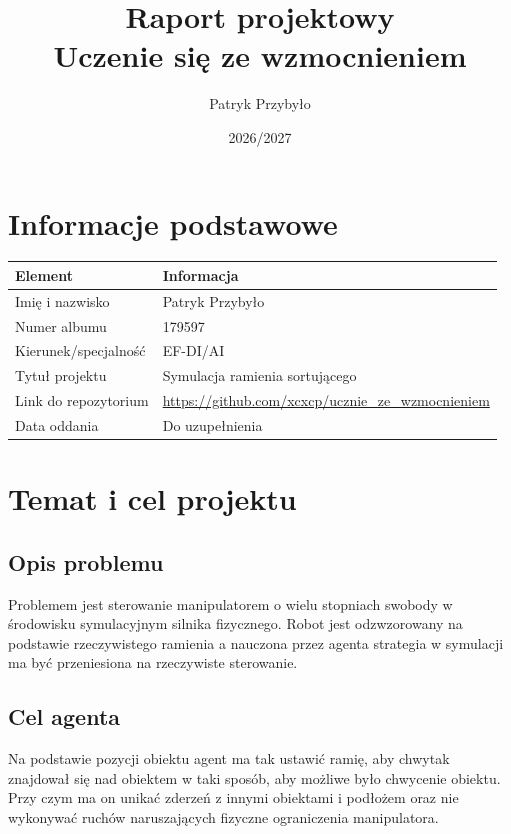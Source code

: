 \documentclass[12pt]{article}
\title{Raport projektowy\\Uczenie się ze wzmocnieniem}
\author{Patryk Przybyło}
\date{2026/2027}
\begin{document}
\maketitle
\tableofcontents
\newpage

\section{Informacje podstawowe}

\begin{center}
\begin{tabular}{p{}p{}}
\toprule
Element & Informacja \\
\midrule
Imię i nazwisko & Patryk Przybyło \\
Numer albumu & 179597 \\
Kierunek/specjalność & EF-DI/AI \\
Tytuł projektu & Symulacja ramienia sortującego \\
Link do repozytorium & \url{https://github.com/xcxcp/ucznie_ze_wzmocnieniem} \\
Data oddania & Do uzupełnienia \\
\bottomrule
\end{tabular}
\end{center}

\section{Temat i cel projektu}

\subsection{Opis problemu}

Problemem jest sterowanie manipulatorem o wielu stopniach swobody w środowisku symulacyjnym silnika fizycznego.
Robot jest odzwzorowany na podstawie rzeczywistego ramienia a nauczona przez agenta strategia w symulacji ma być przeniesiona na rzeczywiste sterowanie.

\subsection{Cel agenta}

Na podstawie pozycji obiektu agent ma tak ustawić ramię, aby chwytak znajdował się nad obiektem w taki sposób, aby możliwe było chwycenie obiektu.
Przy czym ma on unikać zderzeń z innymi obiektami i podłożem oraz nie wykonywać ruchów naruszających fizyczne ograniczenia manipulatora.
\end{document}
